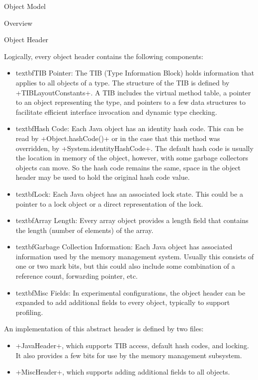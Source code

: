 \begin{section}{Object Model}
\begin{subsection}{Overview}
\end{subsection}

\begin{subsection}{Object Header}

Logically, every object header contains the following components:
\begin{itemize}
  \item textbf{TIB Pointer:} The TIB (Type Information Block) holds information that applies to all objects of a type. The structure of the TIB is defined by \spverb+TIBLayoutConstants+. A TIB includes the virtual method table, a pointer to an object representing the type, and pointers to a few data structures to facilitate efficient interface invocation and dynamic type checking.
  \item textbf{Hash Code:} Each Java object has an identity hash code. This can be read by \spverb+Object.hashCode()+ or in the case that this method was overridden, by \spverb+System.identityHashCode+. The default hash code is usually the location in memory of the object, however, with some garbage collectors objects can move. So the hash code remains the same, space in the object header may be used to hold the original hash code value.
  \item textbf{Lock:} Each Java object has an associated lock state. This could be a pointer to a lock object or a direct representation of the lock.
  \item textbf{Array Length:} Every array object provides a length field that contains the length (number of elements) of the array.
  \item textbf{Garbage Collection Information:} Each Java object has associated information used by the memory management system. Usually this consists of one or two mark bits, but this could also include some combination of a reference count, forwarding pointer, etc.
  \item textbf{Misc Fields:} In experimental configurations, the object header can be expanded to add additional fields to every object, typically to support profiling.
\end{itemize}

An implementation of this abstract header is defined by two files:
\begin{itemize}
  \item \spverb+JavaHeader+, which supports TIB access, default hash codes, and locking. It also provides a few bits for use by the memory management subsystem.
  \item \spverb+MiscHeader+, which supports adding additional fields to all objects.
\end{itemize}


\end{subsection}
\end{section}
